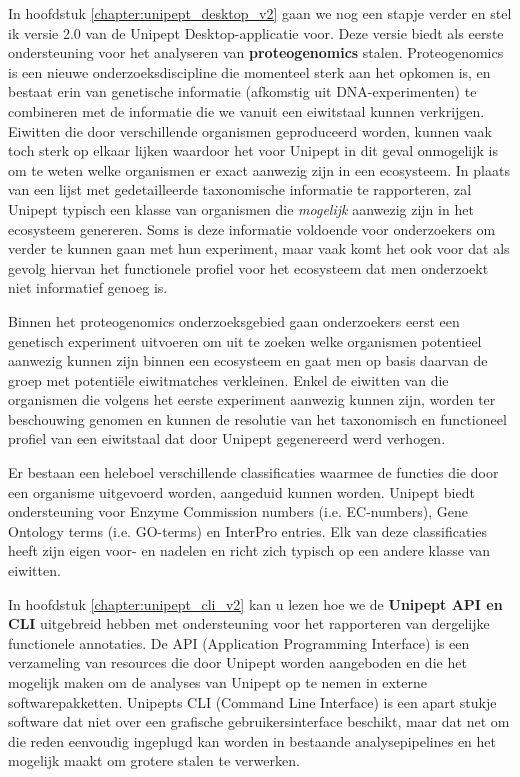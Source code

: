 In hoofdstuk \ref{chapter:unipept_desktop_v2} gaan we nog een stapje verder en stel ik versie 2.0 van de Unipept Desktop-applicatie voor.
Deze versie biedt als eerste ondersteuning voor het analyseren van \textbf{proteogenomics} stalen.
Proteogenomics is een nieuwe onderzoeksdiscipline die momenteel sterk aan het opkomen is, en bestaat erin van genetische informatie (afkomstig uit DNA-experimenten) te combineren met de informatie die we vanuit een eiwitstaal kunnen verkrijgen.
Eiwitten die door verschillende organismen geproduceerd worden, kunnen vaak toch sterk op elkaar lijken waardoor het voor Unipept in dit geval onmogelijk is om te weten welke organismen er exact aanwezig zijn in een ecosysteem.
In plaats van een lijst met gedetailleerde taxonomische informatie te rapporteren, zal Unipept typisch een klasse van organismen die \textit{mogelijk} aanwezig zijn in het ecosysteem genereren.
Soms is deze informatie voldoende voor onderzoekers om verder te kunnen gaan met hun experiment, maar vaak komt het ook voor dat als gevolg hiervan het functionele profiel voor het ecosysteem dat men onderzoekt niet informatief genoeg is.

Binnen het proteogenomics onderzoeksgebied gaan onderzoekers eerst een genetisch experiment uitvoeren om uit te zoeken welke organismen potentieel aanwezig kunnen zijn binnen een ecosysteem en gaat men op basis daarvan de groep met potentiële eiwitmatches verkleinen.
Enkel de eiwitten van die organismen die volgens het eerste experiment aanwezig kunnen zijn, worden ter beschouwing genomen en kunnen de resolutie van het taxonomisch en functioneel profiel van een eiwitstaal dat door Unipept gegenereerd werd verhogen.

Er bestaan een heleboel verschillende classificaties waarmee de functies die door een organisme uitgevoerd worden, aangeduid kunnen worden.
Unipept biedt ondersteuning voor Enzyme Commission numbers (i.e. EC-numbers), Gene Ontology terms (i.e. GO-terms) en InterPro entries.
Elk van deze classificaties heeft zijn eigen voor- en nadelen en richt zich typisch op een andere klasse van eiwitten.

In hoofdstuk \ref{chapter:unipept_cli_v2} kan u lezen hoe we de \textbf{Unipept API en CLI} uitgebreid hebben met ondersteuning voor het rapporteren van dergelijke functionele annotaties.
De API (Application Programming Interface) is een verzameling van resources die door Unipept worden aangeboden en die het mogelijk maken om de analyses van Unipept op te nemen in externe softwarepakketten.
Unipepts CLI (Command Line Interface) is een apart stukje software dat niet over een grafische gebruikersinterface beschikt, maar dat net om die reden eenvoudig ingeplugd kan worden in bestaande analysepipelines en het mogelijk maakt om grotere stalen te verwerken.

